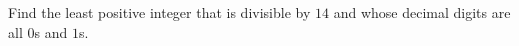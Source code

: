 Find the least positive integer that is divisible by $14$ and whose decimal digits are all $0$s and $1$s.
